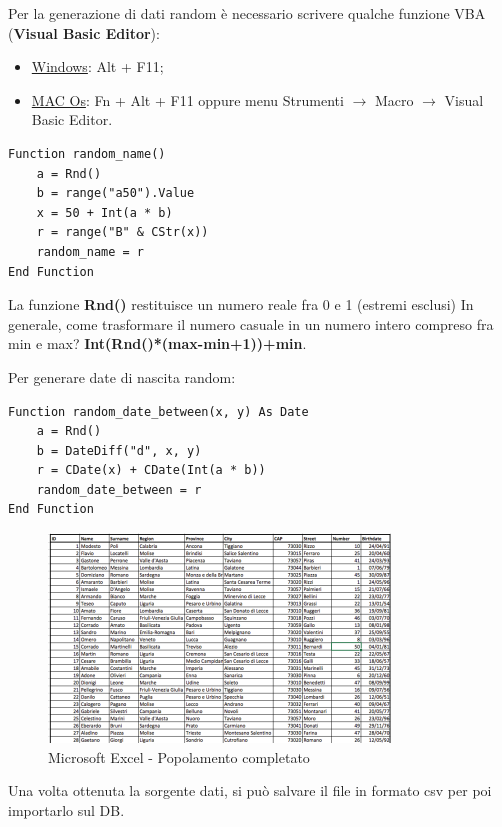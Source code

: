 Per la generazione di dati random è necessario scrivere qualche funzione VBA (\textbf{Visual Basic Editor}):

\begin{itemize}

\item{\underline{Windows}}: Alt + F11;
\item{\underline{MAC Os}}: Fn + Alt + F11 oppure menu Strumenti $\rightarrow$ Macro $\rightarrow$ Visual Basic Editor.

\end{itemize}

\begin{lstlisting}[language={[Visual]Basic}]
Function random_name()
	a = Rnd()
	b = range("a50").Value
	x = 50 + Int(a * b)
	r = range("B" & CStr(x))
	random_name = r
End Function
\end{lstlisting}

La funzione \textbf{Rnd()} restituisce un numero reale fra 0 e 1 (estremi esclusi) In generale, come trasformare il numero casuale in un numero intero compreso fra min e max? \textbf{Int(Rnd()*(max-min+1))+min}.

Per generare date di nascita random: 

\begin{lstlisting}[language={[Visual]Basic}]
Function random_date_between(x, y) As Date
	a = Rnd()
	b = DateDiff("d", x, y)
	r = CDate(x) + CDate(Int(a * b))
	random_date_between = r
End Function
\end{lstlisting}


\begin{center}
\begin{figure}[H]
\centering
\includegraphics[scale=1]{figures/excel_populated2.png}
\caption{Microsoft Excel - Popolamento completato} 
\end{figure}
\end{center}

Una volta ottenuta la sorgente dati, si può salvare il file in formato csv per poi importarlo sul DB.


